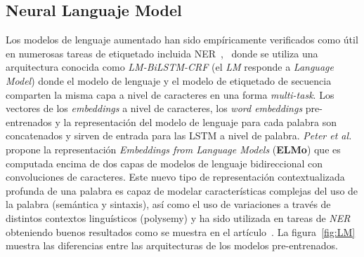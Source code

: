 \subsection{Neural Languaje Model}

%
%
%
%
%

Los modelos de lenguaje aumentado han sido emp\'iricamente verificados como \'util en numerosas tareas de etiquetado incluida NER~\cite{liu2018efficient},~\cite{liu2018empower} donde se utiliza una arquitectura conocida como \emph{LM-BiLSTM-CRF} (el \emph{LM} responde a \emph{Language Model}) donde el modelo de lenguaje y el modelo de etiquetado de secuencia comparten la misma capa a nivel de caracteres en una forma \emph{multi-task}. Los vectores de los \emph{embeddings} a nivel de caracteres, los \emph{word embeddings} pre-entrenados y la representaci\'on del modelo de lenguaje para cada palabra son concatenados y sirven de entrada para las LSTM a nivel de palabra. \emph{Peter et al.}~\cite{peters2018deep} propone la representaci\'on \emph{Embeddings from Language Models} (\textbf{ELMo}) que es computada encima de dos capas de modelos de lenguaje bidireccional con convoluciones de caracteres. Este nuevo tipo de representaci\'on contextualizada profunda de una palabra es capaz de modelar caracter\'isticas complejas del uso de la palabra (sem\'antica y sintaxis), as\'i como el uso de variaciones a trav\'es de distintos contextos lingu\'isticos (polysemy) y ha sido utilizada en tareas de \emph{NER} obteniendo buenos resultados como se muestra en el art\'iculo~\cite{jin2019probing}. La figura~\ref{fig:LM} muestra las diferencias entre las arquitecturas de los modelos pre-entrenados.

